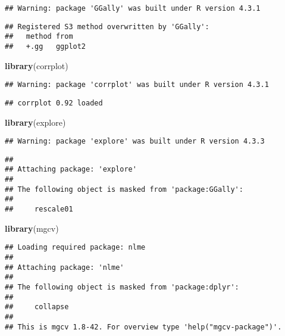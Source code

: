 \documentclass[
]{article}
\newenvironment{Shaded}{\begin{snugshade}}{\end{snugshade}}
\newcommand{\FunctionTok}[1]{\textcolor[rgb]{0.13,0.29,0.53}{\textbf{#1}}}
\newcommand{\NormalTok}[1]{#1}
\begin{document}
\begin{verbatim}
## Warning: package 'GGally' was built under R version 4.3.1
\end{verbatim}

\begin{verbatim}
## Registered S3 method overwritten by 'GGally':
##   method from   
##   +.gg   ggplot2
\end{verbatim}

\begin{Shaded}
\begin{Highlighting}[]
\FunctionTok{library}\NormalTok{(corrplot)}
\end{Highlighting}
\end{Shaded}

\begin{verbatim}
## Warning: package 'corrplot' was built under R version 4.3.1
\end{verbatim}

\begin{verbatim}
## corrplot 0.92 loaded
\end{verbatim}

\begin{Shaded}
\begin{Highlighting}[]
\FunctionTok{library}\NormalTok{(explore)}
\end{Highlighting}
\end{Shaded}

\begin{verbatim}
## Warning: package 'explore' was built under R version 4.3.3
\end{verbatim}

\begin{verbatim}
## 
## Attaching package: 'explore'
## 
## The following object is masked from 'package:GGally':
## 
##     rescale01
\end{verbatim}

\begin{Shaded}
\begin{Highlighting}[]
\FunctionTok{library}\NormalTok{(mgcv)}
\end{Highlighting}
\end{Shaded}

\begin{verbatim}
## Loading required package: nlme
## 
## Attaching package: 'nlme'
## 
## The following object is masked from 'package:dplyr':
## 
##     collapse
## 
## This is mgcv 1.8-42. For overview type 'help("mgcv-package")'.
\end{verbatim}
\end{document}
